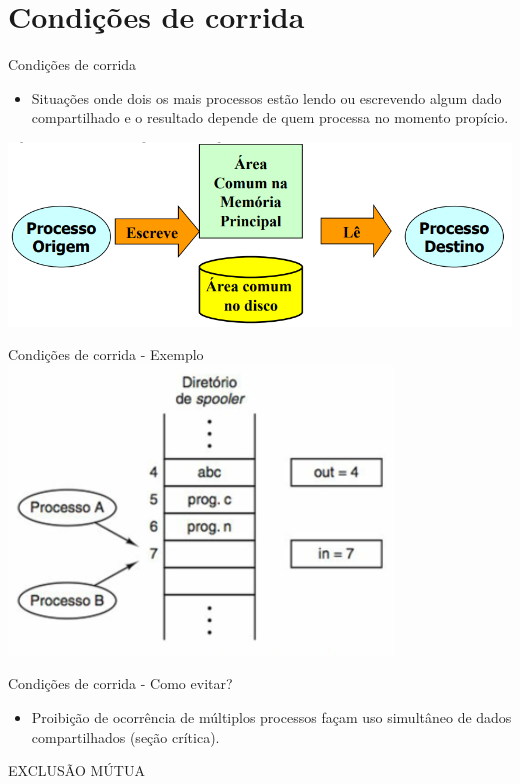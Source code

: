 \documentclass[aspectratio=169,
				xcolor=table]{beamer}
\begin{document}
	\section{Condições de corrida}
	\begin{frame}{Condições de corrida}
		\begin{itemize}			
			\item Situações onde dois os mais processos estão lendo ou escrevendo algum dado compartilhado e o resultado depende de quem processa no momento propício.
		\end{itemize}
			\vspace{1em}
			\includegraphics[keepaspectratio, height=0.5\paperheight]{../figs/cap05/race1.png}
	\end{frame}

	
	\begin{frame}{Condições de corrida - Exemplo}
		\includegraphics[keepaspectratio, height=0.7\paperheight]{../figs/cap05/race2.png}
	\end{frame}
		
	\begin{frame}{Condições de corrida - Como evitar?}
		\begin{itemize}			
			\item Proibição de ocorrência de múltiplos processos façam uso simultâneo de dados compartilhados (seção crítica).
		\end{itemize}
		
		\vspace{2em}
		
		\huge \centering \alert{EXCLUSÃO MÚTUA}
	\end{frame}
	
\end{document}
